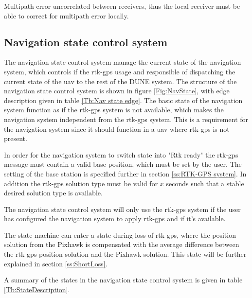 Multipath error uncorrelated between receivers, thus the local receiver must be able to correct for multipath error locally.

\subsection{Navigation state control system}\label{S:NavState}
The navigation state control system manage the current state of the navigation system, which controls if the \gls{rtk-gps} usage and responsible of dispatching the current state of the \gls{uav} to the rest of the DUNE system. The structure of the navigation state control system is shown in figure \ref{Fig:NavState}, with edge description given in table \ref{Tb:Nav state edge}. The basic state of the navigation system function as if the \gls{rtk-gps} system is not available, which makes the navigation system independent from the \gls{rtk-gps} system. This is a requirement for the navigation system since it should function in a \gls{uav} where \gls{rtk-gps} is not present.

In order for the navigation system to switch state into "Rtk ready" the \gls{rtk-gps} message must contain a valid base position, which must be set by the user. The setting of the base station is specified further in section \ref{ss:RTK-GPS system}. In addition the \gls{rtk-gps} solution type must be valid for $x$ seconds such that a stable desired solution type is available.

The navigation state control system will only use the \gls{rtk-gps} system if the user has configured the navigation system to apply \gls{rtk-gps} and if it's available. 

The state machine can enter a state during loss of \gls{rtk-gps}, where the position solution from the Pixhawk is compensated with the average difference between the \gls{rtk-gps} position solution and the Pixhawk solution. This state will be further explained in section \ref{ss:ShortLoss}.

A summary of the states in the navigation state control system is given in table \ref{Tb:StateDescription}.

